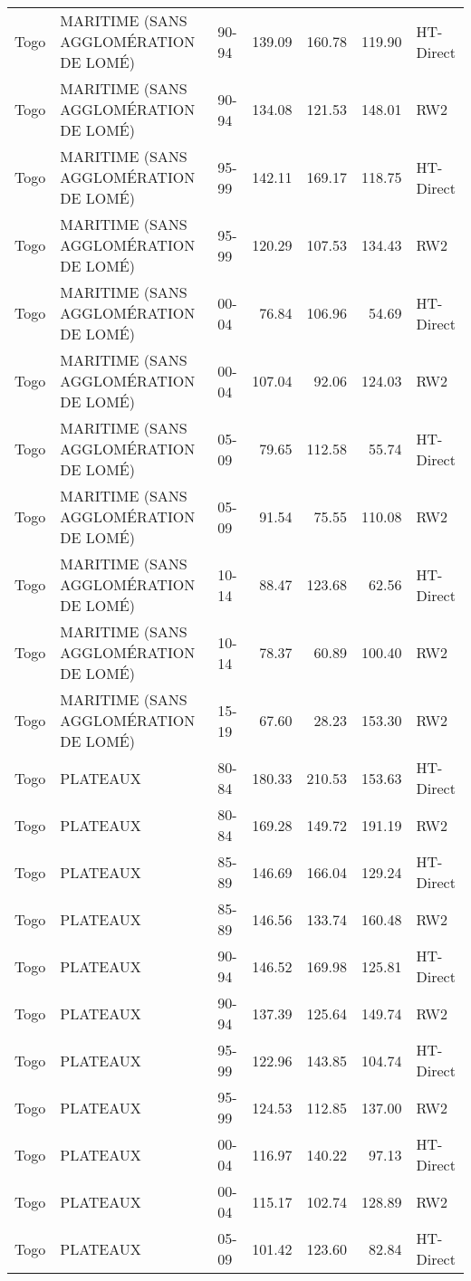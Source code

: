 \begin{longtable}{lllrrrl}
  Togo & MARITIME (SANS AGGLOMÉRATION DE LOMÉ) & 90-94 & 139.09 & 160.78 & 119.90 & HT-Direct \\ 
  Togo & MARITIME (SANS AGGLOMÉRATION DE LOMÉ) & 90-94 & 134.08 & 121.53 & 148.01 & RW2 \\ 
  Togo & MARITIME (SANS AGGLOMÉRATION DE LOMÉ) & 95-99 & 142.11 & 169.17 & 118.75 & HT-Direct \\ 
  Togo & MARITIME (SANS AGGLOMÉRATION DE LOMÉ) & 95-99 & 120.29 & 107.53 & 134.43 & RW2 \\ 
  Togo & MARITIME (SANS AGGLOMÉRATION DE LOMÉ) & 00-04 & 76.84 & 106.96 & 54.69 & HT-Direct \\ 
  Togo & MARITIME (SANS AGGLOMÉRATION DE LOMÉ) & 00-04 & 107.04 & 92.06 & 124.03 & RW2 \\ 
  Togo & MARITIME (SANS AGGLOMÉRATION DE LOMÉ) & 05-09 & 79.65 & 112.58 & 55.74 & HT-Direct \\ 
  Togo & MARITIME (SANS AGGLOMÉRATION DE LOMÉ) & 05-09 & 91.54 & 75.55 & 110.08 & RW2 \\ 
  Togo & MARITIME (SANS AGGLOMÉRATION DE LOMÉ) & 10-14 & 88.47 & 123.68 & 62.56 & HT-Direct \\ 
  Togo & MARITIME (SANS AGGLOMÉRATION DE LOMÉ) & 10-14 & 78.37 & 60.89 & 100.40 & RW2 \\ 
  Togo & MARITIME (SANS AGGLOMÉRATION DE LOMÉ) & 15-19 & 67.60 & 28.23 & 153.30 & RW2 \\ 
  Togo & PLATEAUX & 80-84 & 180.33 & 210.53 & 153.63 & HT-Direct \\ 
  Togo & PLATEAUX & 80-84 & 169.28 & 149.72 & 191.19 & RW2 \\ 
  Togo & PLATEAUX & 85-89 & 146.69 & 166.04 & 129.24 & HT-Direct \\ 
  Togo & PLATEAUX & 85-89 & 146.56 & 133.74 & 160.48 & RW2 \\ 
  Togo & PLATEAUX & 90-94 & 146.52 & 169.98 & 125.81 & HT-Direct \\ 
  Togo & PLATEAUX & 90-94 & 137.39 & 125.64 & 149.74 & RW2 \\ 
  Togo & PLATEAUX & 95-99 & 122.96 & 143.85 & 104.74 & HT-Direct \\ 
  Togo & PLATEAUX & 95-99 & 124.53 & 112.85 & 137.00 & RW2 \\ 
  Togo & PLATEAUX & 00-04 & 116.97 & 140.22 & 97.13 & HT-Direct \\ 
  Togo & PLATEAUX & 00-04 & 115.17 & 102.74 & 128.89 & RW2 \\ 
  Togo & PLATEAUX & 05-09 & 101.42 & 123.60 & 82.84 & HT-Direct \\ 

\end{longtable}
